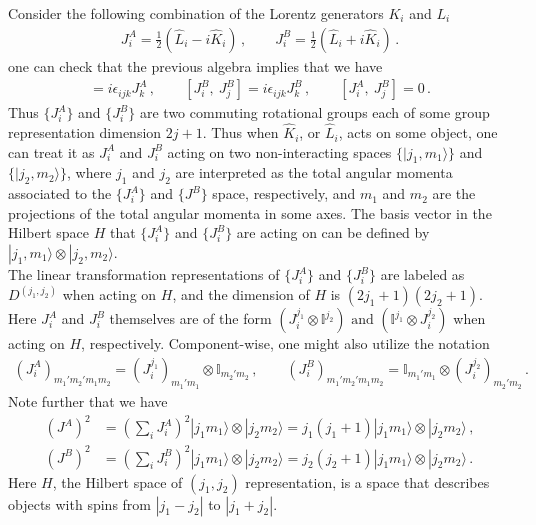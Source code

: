 \documentclass[11pt, onesided]{book}
\theoremstyle{break}
\theoremstyle{break}
\begin{document}
Consider the following combination of the Lorentz generators $K_i$ and $L_i$
\begin{align*}
J_i^A = \frac{1}{2}\left(\hat{L}_i - i\hat{K}_i\right)\,,\qquad J_{i}^B = \frac{1}{2}\left( \hat{L}_i + i\hat{K}_i\right) \,.
\end{align*}
one can check that the previous algebra implies that we have
\begin{align*}
[J^A_i, \ J^A_j ] =i \epsilon_{ijk}J_k^A\,,\qquad [J_i^B,\ J_j^B ] = i\epsilon_{ijk}J_k^B\,,\qquad
[J_{i}^A, \ J_j^B] = 0\,.
\end{align*}
Thus $\{J^A_i\}$ and $\{J^B_i\}$ are two commuting rotational groups each of some group representation dimension  $2j+1$. Thus when $\hat{K}_i$, or $\hat{L}_i$, acts on some object, one can treat it as $J_i^A$ and $J_i^B$ acting on two non-interacting spaces $\{|j_1,m_1\rangle\}$ and $\{|j_2,m_2\rangle\}$, where $j_1$ and $j_2$ are interpreted as the total angular momenta associated to the $\{J^A_i\}$ and $\{J^B\}$ space, respectively, and $m_1$ and $m_2$ are the projections of the total angular momenta in some axes. The basis vector in the Hilbert space $H$ that $\{J^A_i\}$ and $\{J^B_i\}$ are acting on can be defined by $|j_1, m_1\rangle \otimes |j_2,m_2\rangle$.\\

The linear transformation representations of $\{J^A_i\}$ and $\{J^B_i\}$ are labeled as $D^{(j_1,j_2)}$ when acting on $H$, and the dimension of $H$ is $(2j_1 + 1)(2j_2 + 1)$. Here $J_i^A$ and $J_i^B$ themselves are of the form $(J_i^{j_1} \otimes \mathbb{I}^{j_2}) \text{ and } (\mathbb{I}^{j_1}\otimes J_i^{j_2})$ when acting on $H$, respectively. Component-wise, one might also utilize the notation
\begin{align*}
(J_i^A)_{m_1'm_2'm_1m_2} = (J_i^{j_1})_{m_1'm_1} \otimes \mathbb{I}_{m_2' m_2}\,,\qquad
(J_i^B)_{m_1'm_2'm_1m_2} = \mathbb{I}_{m_1'm_1}\otimes (J_i^{j_2})_{m_2'm_2}\,.
\end{align*}
Note further that we have
\begin{align*}
(J^A)^2 &= \left( \sum_i J_i^A\right)^2 |j_1 m_1 \rangle \otimes |j_2m_2\rangle = j_1(j_1+1) |j_1 m_1\rangle \otimes |j_2m_2\rangle\,,\\
(J^B)^2 &= \left( \sum_i J_i^B\right)^2 |j_1m_1\rangle \otimes |j_2 m_2 \rangle = j_2(j_2 +1) | j_1m_1\rangle \otimes |j_2 m_2\rangle\,.
\end{align*}
Here $H$, the Hilbert space of $(j_1, j_2)$ representation, is a space that describes objects with spins from $|j_1-j_2|$ to $|j_1 + j_2|$.\\
\end{document}
